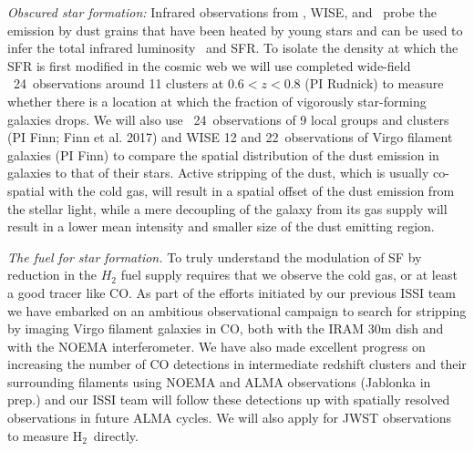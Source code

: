 \documentclass[11pt]{article}
\begin{document}
\textit{Obscured star formation:} Infrared observations from
\spitzer, WISE, and \herschel\ probe the emission by dust grains that have
been heated by young stars and can be used to infer the total
infrared luminosity \lir\ and SFR.  
To isolate the density at which the SFR is first modified in the cosmic web we will use completed wide-field
\spitzer\ 24\micron\ observations around 11 clusters at $0.6<z<0.8$
(PI Rudnick) to measure whether there is a location at which the
fraction of vigorously star-forming galaxies drops.  We will also use
\spitzer\ 24\micron\ observations of 9 local groups and clusters (PI Finn; Finn et al. 2017) and WISE 12 and 22\micron\ observations of Virgo filament galaxies (PI Finn) to
compare the spatial distribution of the dust emission in galaxies to
that of their stars.  Active stripping of the dust, which is usually co-spatial with the cold gas, will
result in a spatial offset of the dust emission from the stellar
light, while a mere decoupling of the galaxy from its gas supply will
result in a lower mean intensity and smaller  size of the dust emitting region.

\textit{The fuel for star formation.} To truly understand the
modulation of SF by reduction in the $H_2$ fuel supply
requires that we observe the cold gas, or at least a good tracer like CO.  
As part of the efforts initiated by our previous ISSI team we have embarked on an ambitious observational campaign to search for stripping by imaging Virgo filament galaxies in CO, both with the IRAM 30m dish and with the NOEMA interferometer.   We have also made excellent progress on increasing the number of CO detections in intermediate redshift clusters and their surrounding filaments using NOEMA \citep{Jablonka13} and ALMA observations (Jablonka in prep.) and our ISSI team will follow these detections up with spatially resolved observations in future ALMA cycles.  We will also apply for JWST observations to measure H$_2$~directly.  
\end{document}
